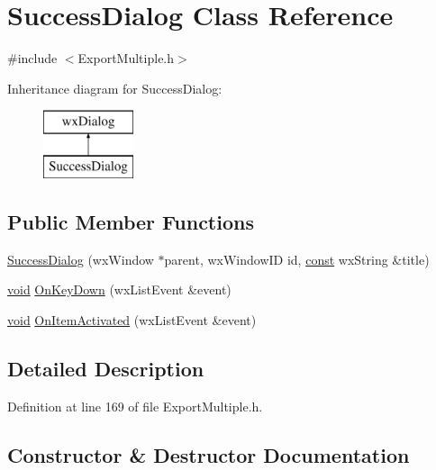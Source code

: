 \hypertarget{class_success_dialog}{}\section{Success\+Dialog Class Reference}
\label{class_success_dialog}


{\ttfamily \#include $<$Export\+Multiple.\+h$>$}

Inheritance diagram for Success\+Dialog\+:\begin{figure}[H]
\begin{center}
\leavevmode
\includegraphics[height=2.000000cm]{class_success_dialog}
\end{center}
\end{figure}
\subsection*{Public Member Functions}
\begin{DoxyCompactItemize}
\item 
\hyperlink{class_success_dialog_a191aec742816dee272605744ef0b52e8}{Success\+Dialog} (wx\+Window $\ast$parent, wx\+Window\+ID id, \hyperlink{getopt1_8c_a2c212835823e3c54a8ab6d95c652660e}{const} wx\+String \&title)
\item 
\hyperlink{sound_8c_ae35f5844602719cf66324f4de2a658b3}{void} \hyperlink{class_success_dialog_a6d0e043f6fbb19893b3bd47e1d741717}{On\+Key\+Down} (wx\+List\+Event \&event)
\item 
\hyperlink{sound_8c_ae35f5844602719cf66324f4de2a658b3}{void} \hyperlink{class_success_dialog_ad228f65d159355adb1910ef913ce323e}{On\+Item\+Activated} (wx\+List\+Event \&event)
\end{DoxyCompactItemize}


\subsection{Detailed Description}


Definition at line 169 of file Export\+Multiple.\+h.



\subsection{Constructor \& Destructor Documentation}
